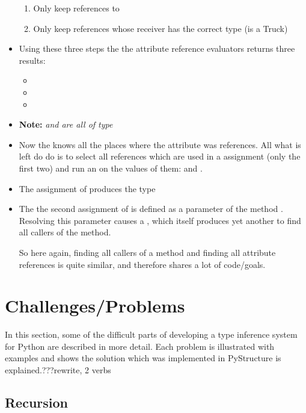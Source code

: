 \documentclass[12pt,halfparskip,DIV11,BCOR10mm]{scrreprt}
\begin{document}
\begin{itemize}
\begin{enumerate}
        \item Only keep references to 
        \item Only keep references whose receiver has the correct type (is a Truck)
    \end{enumerate}
    \item Using these three steps the the attribute reference evaluators returns three results:
    \begin{itemize}
        \item {}
        \item {}
        \item {}
    \end{itemize}
    \item \textbf{Note:} \emph{ and  are all of type }
    \item Now the  knows all the places where the attribute was references. All what is left do do is to select all references which are used in a assignment (only the first two) and run an  on the values of them:  and .
    \item The assignment of  produces the type 
    \item The the second assignment of  is defined as a parameter of the method . Resolving this parameter causes a , which itself produces yet another  to find all callers of the method.

So here again, finding all callers of a method and finding all attribute references is quite similar, and therefore shares a lot of code/goals.
    
\end{itemize}

\section{Challenges/Problems}

In this section, some of the difficult parts of developing a type inference system for Python are described in more detail. Each problem is illustrated with examples and shows the solution which was implemented in PyStructure is explained.???rewrite, 2 verbs

\subsection{Recursion}
\label{recursion}
\end{document}
